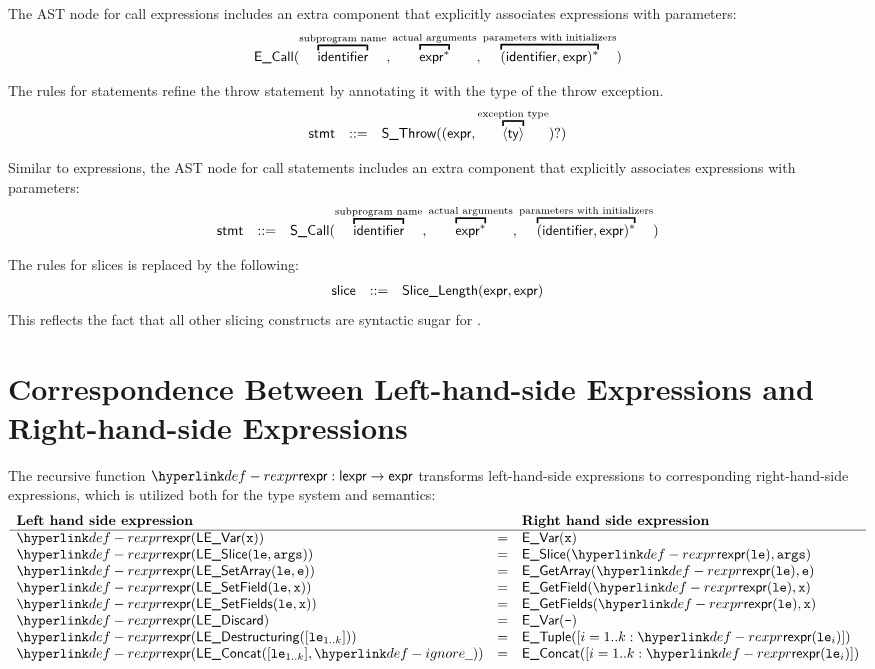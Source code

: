 \documentclass{book}
\begin{document}
The AST node for call expressions includes an extra component that explicitly associates expressions
with parameters:
\[
\begin{array}{rcl}
\ECall(\overtext{\identifier}{subprogram name}, \overtext{\expr^{*}}{actual arguments}, \overtext{(\identifier, \expr)^{*}}{parameters with initializers})
\end{array}
\]

The rules for statements refine the throw statement by annotating it with
the type of the throw exception.
\[
\begin{array}{rcl}
\stmt &::=& \SThrow((\expr, \overtext{\langle\ty\rangle}{exception type})?)
\end{array}
\]

Similar to expressions, the AST node for call statements includes an extra component that explicitly associates expressions
with parameters:
\[
\begin{array}{rcl}
  \stmt &::=&  \SCall(\overtext{\identifier}{subprogram name}, \overtext{\expr^{*}}{actual arguments}, \overtext{(\identifier, \expr)^{*}}{parameters with initializers})
\end{array}
\]


The rules for slices is replaced by the following:
\[
\begin{array}{rcl}
\textsf{slice} &::=& \textsf{Slice\_Length}(\textsf{expr}, \textsf{expr}) \\
\end{array}
\]
This reflects the fact that all other slicing constructs are syntactic sugar
for \SliceLength.

\chapter{Correspondence Between Left-hand-side Expressions and Right-hand-side Expressions
\label{ch:LeftToRight}}

The recursive function $\torexpr : \lexpr \rightarrow \expr$ transforms
left-hand-side expressions to corresponding right-hand-side expressions,
which is utilized both for the type system and semantics:
\[
\begin{array}{lcl}
  \textbf{Left hand side expression} & & \textbf{Right hand side expression}\\
  \hline
  \torexpr(\LEVar(\vx)) &=& \EVar(\vx)\\
  \torexpr(\LESlice(\vle, \vargs)) &=& \ESlice(\torexpr(\vle), \vargs)\\
  \torexpr(\LESetArray(\vle, \ve)) &=& \EGetArray(\torexpr(\vle), \ve)\\
  \torexpr(\LESetField(\vle, \vx)) &=& \EGetField(\torexpr(\vle), \vx)\\
  \torexpr(\LESetFields(\vle, \vx)) &=& \EGetFields(\torexpr(\vle), \vx)\\
  \torexpr(\LEDiscard) &=& \EVar(\texttt{-})\\
  \torexpr(\LEDestructuring([\vle_{1..k}])) &=& \ETuple([i=1..k: \torexpr(\vle_i)])\\
  \torexpr(\LEConcat([\vle_{1..k}], \Ignore)) &=& \EConcat([i=1..k: \torexpr(\vle_i)])\\
\end{array}
\]
\end{document}
